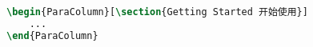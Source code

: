 \begin{lstlisting}[language=LaTeX]
\begin{ParaColumn}[\section{Getting Started 开始使用}]
    ...
\end{ParaColumn}
\end{lstlisting}